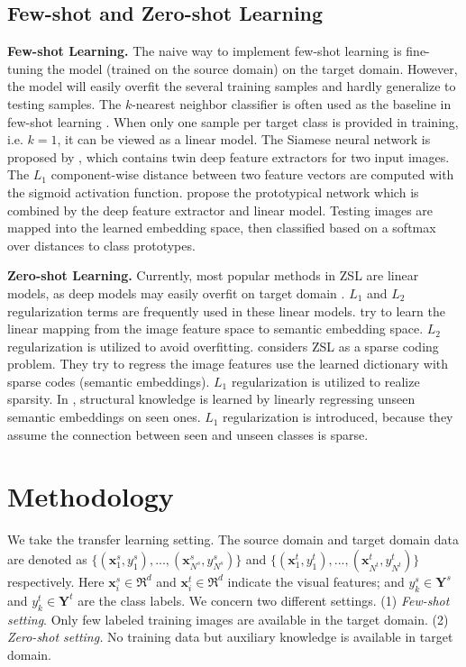 \documentclass{article}
\begin{document}
\subsection{Few-shot and Zero-shot Learning}


\textbf{Few-shot Learning.} The naive way to implement few-shot learning
is fine-tuning the model (trained on the source domain) on the target
domain. However, the model will easily overfit the several training
samples and hardly generalize to testing samples. The $k$-nearest
neighbor classifier is often used as the baseline in few-shot learning
\citet{koch2015siamese,santoro2016meta}. When only one sample per
target class is provided in training, i.e. $k=1$, it can be viewed
as a linear model. The Siamese neural network is proposed by \citet{koch2015siamese},
which contains twin deep feature extractors for two input images.
The $L_{1}$ component-wise distance between two feature vectors are
computed with the sigmoid activation function. \citet{snell2017prototypical}
propose the prototypical network which is combined by the deep feature
extractor and linear model. Testing images are mapped into the learned
embedding space, then classified based on a softmax over distances
to class prototypes.


\noindent \textbf{Zero-shot Learning.} Currently, most popular methods
in ZSL are linear models, as deep models may easily overfit on target
domain \citet{zhang2016learning}. $L_{1}$ and $L_{2}$ regularization
terms are frequently used in these linear models. \citet{palatucci2009zero,li2015semi}
try to learn the linear mapping from the image feature space to semantic
embedding space. $L_{2}$ regularization is utilized to avoid overfitting.
\citet{li2015semi} considers ZSL as a sparse coding problem. They
try to regress the image features use the learned dictionary with
sparse codes (semantic embeddings). $L_{1}$ regularization is utilized
to realize sparsity. In \citet{wang2016relational,zhao2017zero},
structural knowledge is learned by linearly regressing unseen semantic
embeddings on seen ones. $L_{1}$ regularization is introduced, because
they assume the connection between seen and unseen classes is sparse.


\section{Methodology}


We take the transfer learning setting. The source domain and target
domain data are denoted as $\{(\mathbf{x}_{1}^{s},{y}_{1}^{s}),...,(\mathbf{x}_{N^{s}}^{s},{y}_{N^{s}}^{s})\}$
and $\{(\mathbf{x}_{1}^{t},{y}_{1}^{t}),...,(\mathbf{x}_{N^{t}}^{t},{y}_{N^{t}}^{t})\}$
respectively. Here $\mathbf{x}_{i}^{s}\in\Re^{d}$ and $\mathbf{x}_{i}^{t}\in\Re^{d}$
indicate the visual features; and ${y}_{k}^{s}\in\mathbf{Y}^{s}$
and ${y}_{k}^{t}\in\mathbf{Y}^{t}$ are the class labels. We concern
two different settings. (1) \emph{Few-shot setting}. Only few labeled
training images are available in the target domain. (2) \emph{Zero-shot
setting.} No training data but auxiliary knowledge is available in
target domain.
\end{document}
